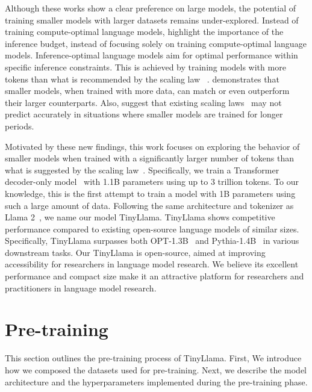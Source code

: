 \documentclass{article}
\begin{document}
Although these works show a clear preference on large models, 
    the potential of training smaller models with larger datasets remains under-explored.
%
Instead of training compute-optimal language models, \cite{touvron2023llama} highlight the importance of the inference budget, instead of focusing solely on training compute-optimal language models.
%
Inference-optimal language models aim for optimal performance within specific inference constraints.
%
This is achieved by training models with more tokens than what is recommended by the scaling law ~\citep{hoffmann2022chinchilla}.
%
\cite{touvron2023llama} demonstrates that smaller models, when trained with more data, can match or even outperform their larger counterparts.
%
Also, \cite{thaddee2020cd} suggest that existing scaling laws~\citep{hoffmann2022chinchilla} may not predict accurately in situations where smaller models are trained for longer periods.
%

Motivated by these new findings, this work focuses on exploring the behavior of smaller models when trained with a significantly larger number of tokens than what is suggested by the scaling law~\citep{hoffmann2022chinchilla}.
%
Specifically, we train a Transformer decoder-only model~\citep{vaswani2017transformer} with 1.1B parameters using up to 3 trillion tokens.
%
To our knowledge, this is the first attempt to train a model with 1B parameters using such a large amount of data.
%
Following the same architecture and tokenizer as Llama 2~\citep{touvron2023llama2}, we name our model TinyLlama.
%
TinyLlama shows competitive performance compared to existing open-source language models of similar sizes.
%
Specifically, TinyLlama surpasses both OPT-1.3B~\citep{zhang2022opt} and Pythia-1.4B~\citep{biderman2023pythia} in various downstream tasks.
%
%
%
Our TinyLlama is open-source, aimed at improving accessibility for researchers in language model research. 
%
We believe its excellent performance and compact size make it an attractive platform for researchers and practitioners in language model research.
%


\vspace{-1em}
\section{Pre-training}
\vspace{-1em}
This section outlines the pre-training process of TinyLlama. 
%
First, We introduce how we composed the datasets used for pre-training. 
%
Next, we describe the model architecture and the hyperparameters implemented during the pre-training phase.
\vspace{-0.3em}
\end{document}

